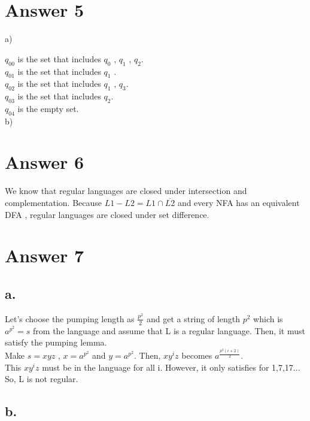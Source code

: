 \documentclass[12pt]{article}
\begin{document}
\section*{Answer 5}
a) \\
\newline

$q_{00}$ is the set that includes $q_0$ , $q_1$ , $q_2$. \\
$q_{01}$ is the set that includes $q_1$ . \\
$q_{02}$ is the set that includes $q_1$ , $q_3$. \\
$q_{03}$ is the set that includes $q_2$. \\
$q_{04}$ is the empty set. \\

b) \\

\section*{Answer 6}

We know that regular languages are closed under intersection and complementation. Because $L1 - L2 = L1 \cap  \overline{L2}$ and 
every NFA has an equivalent DFA , regular languages are closed under set difference. \\ 

\section*{Answer 7}

\subsection*{a.}
Let's choose the pumping length as $\frac{ p^2 }{2}$ and get a string of length $p^2$ which is $a^{ p^2 } = s$ from the language and assume that L is a regular language. Then, it must satisfy the pumping lemma. \\
Make $s=xyz$ , $x=a^{ p^2 }$ and $y=a^{p^2}$. Then, $xy^{i}z$ becomes $a^{ \frac{ p^2 (i+2)}{2 } }$. \\
This $xy^{i}z$ must be in the language for all i. However, it only satisfies for 1,7,17... So, L is not regular. \\
\subsection*{b.}
\end{document}
